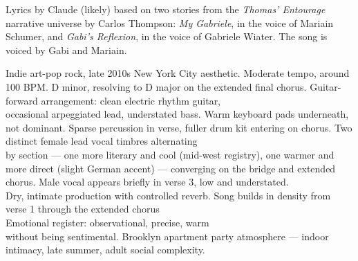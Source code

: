 
\begin{notes}
Lyrics by Claude (likely) based on two stories from the \emph{Thomas’ Entourage} narrative universe by Carlos Thompson: \emph{My Gabriele}, in the voice of Mariain Schumer, and \emph{Gabi’s Reflexion}, in the voice of Gabriele Wiater. The song is voiced by Gabi and Mariain.
\end{notes}

\begin{style}
Indie art-pop rock, late 2010s New York City aesthetic. %
Moderate tempo, around 100 BPM. %
D minor, resolving to D major on the extended final chorus. %
Guitar-forward arrangement: clean electric rhythm guitar,\\ 
occasional arpeggiated lead, understated bass. %
Warm keyboard pads underneath, not dominant. %
Sparse percussion in verse, fuller drum kit entering on chorus. %
Two distinct female lead vocal timbres alternating\\ 
by section — one more literary and cool (mid-west registry), one warmer and more direct (slight German accent) — converging on the bridge and extended chorus. %
Male vocal appears briefly in verse 3, low and understated.\\
Dry, intimate production with controlled reverb. %
Song builds in density from verse 1 through the extended chorus\\
Emotional register: observational, precise, warm\\ 
without being sentimental. %
Brooklyn apartment party atmosphere — indoor intimacy, late summer, adult social complexity.
\end{style}

